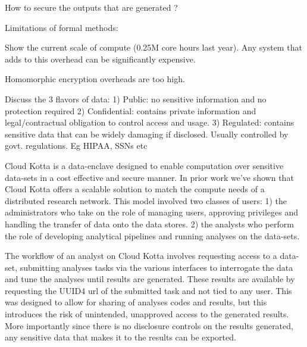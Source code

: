  How to secure the outputs that are generated ?

 Limitations of formal methods:

 Show the current scale of compute (0.25M core hours last year). Any system that adds to this overhead can
 be significantly expensive.

 Homomorphic encryption overheads are too high.


 Discuss the 3 flavors of data:
 1) Public: no sensitive information and no protection required
 2) Confidential: contains private information and legal/contractual obligation to control access and usage.
 3) Regulated: contains sensitive data that can be widely damaging if disclosed. Usually controlled by govt.
    regulations. Eg HIPAA, SSNs etc


Cloud Kotta is a data-enclave designed to enable computation over sensitive data-sets
in a cost effective and secure manner. In prior work we've shown that Cloud Kotta offers
a scalable solution to match the compute needs of a distributed research network.
This model involved two classes of users: 1) the administrators who take on the role of managing
users, approving privileges and handling the transfer of data onto the data stores. 2) the analysts
who perform the role of developing analytical pipelines and running analyses on the data-sets.

The workflow of an analyst on Cloud Kotta involves requesting access to a data-set, submitting analyses
tasks via the various interfaces to interrogate the data and tune the analyses until results are generated.
These results are available by requesting the UUID4 url of the submitted task and not tied to any user.
This was designed to allow for sharing of analyses codes and results, but this introduces the risk
of unintended, unapproved access to the generated results. More importantly since there is no disclosure
controls on the results generated, any sensitive data that makes it to the results can be exported.

